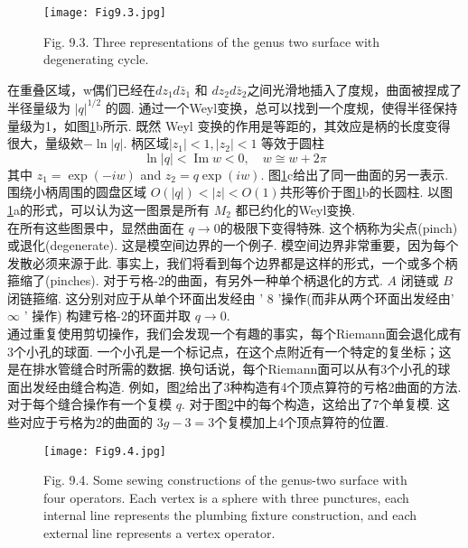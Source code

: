 \begin{figure}
	\begin{center}
		\texttt{[image: Fig9.3.jpg]}\\
		\caption{Fig. 9.3. Three representations of the genus two surface with degenerating cycle.}\label{Fig9.3}
	\end{center}
\end{figure}

在重叠区域，w偶们已经在$d z_{1} d \bar{z}_{1}$ 和 $d z_{2} d \bar{z}_{2}$之间光滑地插入了度规，曲面被捏成了半径量级为 $|q|^{1 / 2} $ 的圆. 通过一个Weyl变换，总可以找到一个度规，使得半径保持量级为1，如图\ref{Fig9.3}b所示. 既然 Weyl 变换的作用是等距的，其效应是柄的长度变得很大，量级欸$-\ln |q| $. 柄区域$\left|z_{1}\right|<1,\left|z_{2}\right|<1$ 等效于圆柱
\begin{equation}
	\ln |q|<\operatorname{Im} w<0, \quad w \cong w+2 \pi
\end{equation}
其中 $z_{1}=\exp (-i w)$ and $z_{2}=q \exp (i w) $. 图\ref{Fig9.3}c给出了同一曲面的另一表示. 围绕小柄周围的圆盘区域 $O(|q|)<|z|<O(1)$共形等价于图\ref{Fig9.3}b的长圆柱. 以图\ref{Fig9.3}a的形式，可以认为这一图景是所有 $M_{2}$ 都已约化的Weyl变换.\\
在所有这些图景中，显然曲面在 $q \rightarrow 0$的极限下变得特殊. 这个柄称为尖点(pinch)或退化(degenerate). 这是模空间边界的一个例子. 模空间边界非常重要，因为每个发散必须来源于此. 事实上，我们将看到每个边界都是这样的形式，一个或多个柄箍缩了(pinches).  对于亏格-2的曲面，有另外一种单个柄退化的方式. $A$ 闭链或 $B$ 闭链箍缩. 这分别对应于从单个环面出发经由 ' 8 '操作(而非从两个环面出发经由' $\infty$ ' 操作) 构建亏格-2的环面并取 $q \rightarrow 0$.\\
通过重复使用剪切操作，我们会发现一个有趣的事实，每个Riemann面会退化成有3个小孔的球面. 一个小孔是一个标记点，在这个点附近有一个特定的复坐标；这是在排水管缝合时所需的数据. 换句话说，每个Riemann面可以从有3个小孔的球面出发经由缝合构造. 例如，图\ref{Fig9.4}给出了3种构造有4个顶点算符的亏格2曲面的方法. 对于每个缝合操作有一个复模 $q$. 对于图\ref{Fig9.4}中的每个构造，这给出了7个单复模. 这些对应于亏格为2的曲面的 $3 g-3=3$个复模加上4个顶点算符的位置.

\begin{figure}
	\begin{center}
		\texttt{[image: Fig9.4.jpg]}\\
		\caption{Fig. 9.4. Some sewing constructions of the genus-two surface with four operators. Each vertex is a sphere with three punctures, each internal line represents the plumbing fixture construction, and each external line represents a vertex operator.}\label{Fig9.4}
	\end{center}
\end{figure}

